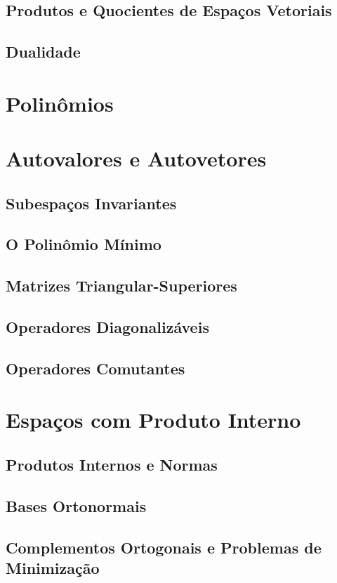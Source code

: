 \documentclass[12pt]{article}
\theoremstyle{plain}
\theoremstyle{definition}
\theoremstyle{remark}
\begin{document}
\subsection{Produtos e Quocientes de Espaços Vetoriais}
\subsection{Dualidade}

\section{Polinômios}

\section{Autovalores e Autovetores}
\subsection{Subespaços Invariantes}
\subsection{O Polinômio Mínimo}
\subsection{Matrizes Triangular-Superiores}
\subsection{Operadores Diagonalizáveis}
\subsection{Operadores Comutantes}

\section{Espaços com Produto Interno}
\subsection{Produtos Internos e Normas}
\subsection{Bases Ortonormais}
\subsection{Complementos Ortogonais e Problemas de Minimização}
\end{document}
